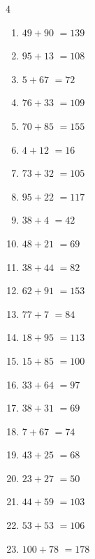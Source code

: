 \begin{multicols}{4}
\begin{enumerate}
  \item $49+90$
        $=139$

  \item $95+13$
        $=108$

  \item $5+67$
        $=72$

  \item $76+33$
        $=109$

  \item $70+85$
        $=155$

  \item $4+12$
        $=16$

  \item $73+32$
        $=105$

  \item $95+22$
        $=117$

  \item $38+4$
        $=42$

  \item $48+21$
        $=69$

  \item $38+44$
        $=82$

  \item $62+91$
        $=153$

  \item $77+7$
        $=84$

\columnbreak %

  \item $18+95$
        $=113$

  \item $15+85$
        $=100$

  \item $33+64$
        $=97$

  \item $38+31$
        $=69$

  \item $7+67$
        $=74$

  \item $43+25$
        $=68$

  \item $23+27$
        $=50$

  \item $44+59$
        $=103$

  \item $53+53$
        $=106$

  \item $100+78$
        $=178$


\end{enumerate}
\end{multicols}

